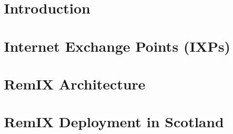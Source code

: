 \documentclass{sig-alternate-05-2015}
\begin{document}
\begin{abstract}
\begin{comment}
Rural access networks are designed to bridge the `last-mile' broadband
gap in regions that are under-served by traditional broadband
providers. Their construction is bespoke, driven by their
beneficiaries, and determined by physical landscape, population
distribution, and monetary budget. Irrespective of their differences,
they are joined by one substantial challenge: connecting to the rest
of the Internet is prohibitively expensive. HUBS \textsc{c.i.c} was
created in Scotland to respond to this. It is a co-operative of access
network members that generates the economies of scale required to
afford backhaul and Internet transit. While intermediation at the IP
layer between the members and the Internet is required for reasons of
scale, it is neither necessary nor desirable amongst the member
networks themselves. In urban areas, networks could interconnect with
each other at an Internet Exchange Point (IXP). In Scotland where the
networks are scattered across 80,000km$^2$ of mountain, field, and sea
it is not so easy. We bridge this gap with a design for a distributed
Internet exchange for access networks in remote places. Doing so
allows for bilateral arrangements for mutual support and assistance
between these networks, and increases the resilience of access network
connectivity. We present the relevant components, and describe our
implementation, so that our efforts may be reproduced.
\end{comment} %
\end{abstract}


%
%

\section{Introduction} \label{sec:intro} 

\section{Internet Exchange Points (IXPs)} \label{sec:context} 

\section{RemIX Architecture} \label{sec:arch} 

\section{RemIX Deployment in Scotland} \label{sec:impl} 
\end{document}
